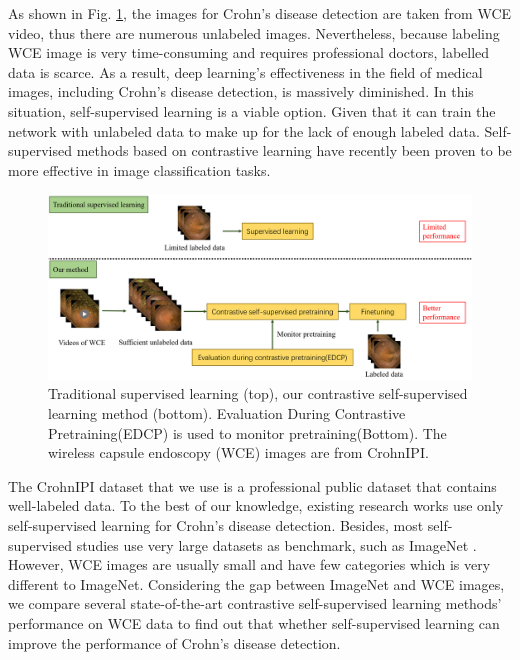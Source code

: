 \documentclass[conference]{IEEEtran}
\begin{document}
As shown in Fig. \ref{fig:method}, the images for Crohn's disease detection are taken from WCE video, thus there are numerous unlabeled images. Nevertheless, because labeling WCE image is very time-consuming and requires professional doctors, labelled data is scarce.  As a result, deep learning's effectiveness in the field of medical images, including Crohn's disease detection, is massively diminished. In this situation, self-supervised learning is a viable option. Given that it can train the network with unlabeled data to make up for the lack of enough labeled data. Self-supervised methods based on contrastive learning have recently been proven to be more effective in image classification tasks.
\begin{figure}[t]
\centerline{\includegraphics[scale=0.5]{images/method.png}}
\caption{Traditional supervised learning (top), our contrastive self-supervised learning method (bottom). Evaluation During Contrastive Pretraining(EDCP) is used to monitor pretraining(Bottom). The wireless capsule endoscopy (WCE) images are from CrohnIPI\cite{crohIPI}.}
\label{fig:method}
\end{figure}
The CrohnIPI\cite{crohIPI} dataset that we use is a professional public dataset that contains well-labeled data.
To the best of our knowledge, existing research works use only self-supervised learning  for Crohn's disease detection. Besides, most self-supervised studies use very large datasets as benchmark, such as ImageNet \cite{deng2009imagenet}. However, WCE images are usually small and have few categories which is very different to ImageNet. Considering the gap between ImageNet and WCE images, we compare several state-of-the-art contrastive self-supervised learning methods' performance on WCE data to find out that whether self-supervised learning can improve the performance of Crohn's disease detection. 
\end{document}
